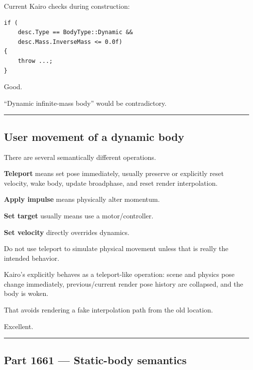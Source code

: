 Current Kairo checks during construction:

\begin{verbatim}
if (
    desc.Type == BodyType::Dynamic &&
    desc.Mass.InverseMass <= 0.0f)
{
    throw ...;
}
\end{verbatim}

Good.

``Dynamic infinite-mass body'' would be contradictory.

\begin{center}\rule{0.5\linewidth}{0.5pt}\end{center}

\subsection{User movement of a dynamic body}\label{06-engine-ii-ch037-user-movement-of-a-dynamic-body}

\hypertarget{06-engine-ii-ch037-user-movement-of-a-dynamic-body}{}

There are several semantically different operations.

\textbf{Teleport} means set pose immediately, usually preserve or explicitly reset velocity, wake body, update broadphase, and reset render interpolation.

\textbf{Apply impulse} means physically alter momentum.

\textbf{Set target} usually means use a motor/controller.

\textbf{Set velocity} directly overrides dynamics.

Do not use teleport to simulate physical movement unless that is really the intended behavior.

Kairo's  explicitly behaves as a teleport-like operation: scene and physics pose change immediately, previous/current render pose history are collapsed, and the body is woken.

That avoids rendering a fake interpolation path from the old location.

Excellent.

\begin{center}\rule{0.5\linewidth}{0.5pt}\end{center}

\subsection{Part 1661 --- Static-body semantics}\label{06-engine-ii-ch037-part-1661-static-body-semantics}


